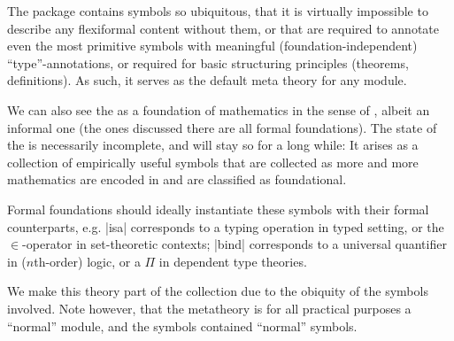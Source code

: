 The  package contains \sTeX symbols so ubiquitous, that it is
virtually impossible to describe any flexiformal content without them, or that are
required to annotate even the most primitive symbols with meaningful
(foundation-independent) ``type''-annotations, or required for basic structuring
principles (theorems, definitions). As such, it serves as the default meta theory for any
\sTeX module.

We can also see the  as a foundation of mathematics in the sense of
\cite{rabe:future:15}, albeit an informal one (the ones discussed there are all formal
foundations). The state of the  is necessarily incomplete, and will
stay so for a long while: It arises as a collection of empirically useful symbols that are
collected as more and more mathematics are encoded in \sTeX and are classified as
foundational.

Formal foundations should ideally instantiate these symbols with their formal counterparts,
e.g. |isa| corresponds to a typing operation in typed setting, or the $\in$-operator in
set-theoretic contexts; |bind| corresponds to a universal quantifier in ($n$th-order)
logic, or a $\Pi$ in dependent type theories.

We make this theory part of the \sTeX collection due to the obiquity
of the symbols involved. Note however, that the metatheory is
for all practical purposes a ``normal'' \sTeX module, and the
symbols contained ``normal'' \sTeX symbols.


